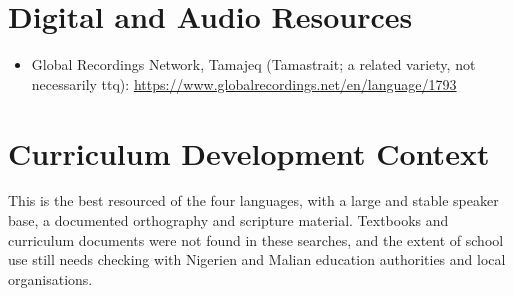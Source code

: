 \documentclass[12pt]{article}
\begin{document}
\section{Digital and Audio Resources}
\begin{itemize}
\item Global Recordings Network, Tamajeq (Tamastrait; a related variety, not necessarily ttq): \url{https://www.globalrecordings.net/en/language/1793}
\end{itemize}

\section{Curriculum Development Context}
This is the best resourced of the four languages, with a large and stable speaker base, a documented orthography and scripture material. Textbooks and curriculum documents were not found in these searches, and the extent of school use still needs checking with Nigerien and Malian education authorities and local organisations.
\end{document}
